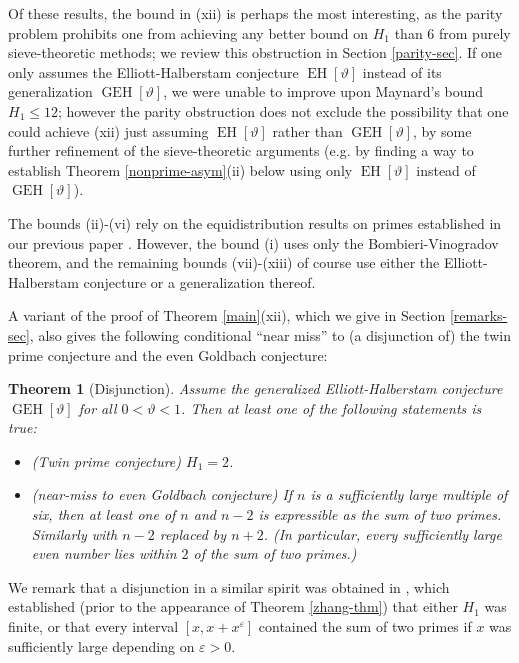 \documentclass{bmcart}
\DeclareMathOperator*\EH{EH}
\DeclareMathOperator*\GEH{GEH}
\theoremstyle{plain}
\newtheorem{theorem}{Theorem}[section]
\theoremstyle{definition}
\newcommand\eps{\varepsilon}
\begin{document}
Of these results, the bound in (xii) is perhaps the most interesting, as the parity problem \cite{selberg} prohibits one from achieving any better bound on $H_1$ than $6$ from purely sieve-theoretic methods; we review this obstruction in Section \ref{parity-sec}.  If one only assumes the Elliott-Halberstam conjecture $\EH[\vartheta]$ instead of its generalization $\GEH[\vartheta]$, we were unable to improve upon Maynard's bound $H_1 \leq 12$; however the parity obstruction does not exclude the possibility that one could achieve (xii) just assuming $\EH[\vartheta]$ rather than $\GEH[\vartheta]$, by some further refinement of the sieve-theoretic arguments (e.g. by finding a way to establish Theorem \ref{nonprime-asym}(ii) below using only $\EH[\vartheta]$ instead of $\GEH[\vartheta]$).

The bounds (ii)-(vi) rely on the equidistribution results on primes established in our previous paper \cite{polymath8a}.  However, the bound (i) uses only the Bombieri-Vinogradov theorem, and the remaining bounds (vii)-(xiii) of course use either the Elliott-Halberstam conjecture or a generalization thereof.

A variant of the proof of Theorem \ref{main}(xii), which we give in Section \ref{remarks-sec}, also gives the following conditional ``near miss'' to (a disjunction of) the twin prime conjecture and the even Goldbach conjecture:

\begin{theorem}[Disjunction]\label{disj} Assume the generalized Elliott-Halberstam conjecture $\GEH[\vartheta]$ for all $0 < \vartheta < 1$.  Then at least one of the following statements is true:
\begin{itemize}
\item[(a)]  (Twin prime conjecture) $H_1=2$.
\item[(b)]  (near-miss to even Goldbach conjecture)  If $n$ is a sufficiently large multiple of six, then at least one of $n$ and $n-2$ is expressible as the sum of two primes.  Similarly with $n-2$ replaced by $n+2$.  (In particular, every sufficiently large even number lies within $2$ of the sum of two primes.)
\end{itemize}
\end{theorem}

We remark that a disjunction in a similar spirit was obtained in \cite{bgc}, which established (prior to the appearance of Theorem \ref{zhang-thm}) that either $H_1$ was finite, or that every interval $[x,x+x^\eps]$ contained the sum of two primes if $x$ was sufficiently large depending on $\eps>0$.  
\end{document}
